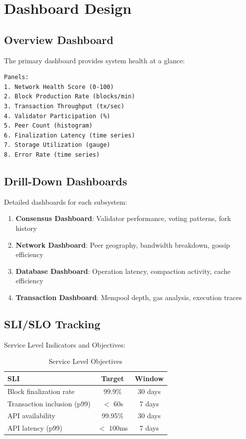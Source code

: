 \documentclass[11pt,a4paper]{article}
\begin{document}
\section{Dashboard Design}

\subsection{Overview Dashboard}

The primary dashboard provides system health at a glance:

\begin{lstlisting}
Panels:
1. Network Health Score (0-100)
2. Block Production Rate (blocks/min)
3. Transaction Throughput (tx/sec)
4. Validator Participation (%)
5. Peer Count (histogram)
6. Finalization Latency (time series)
7. Storage Utilization (gauge)
8. Error Rate (time series)
\end{lstlisting}

\subsection{Drill-Down Dashboards}

Detailed dashboards for each subsystem:

\begin{enumerate}
    \item \textbf{Consensus Dashboard}: Validator performance, voting patterns, fork history
    \item \textbf{Network Dashboard}: Peer geography, bandwidth breakdown, gossip efficiency
    \item \textbf{Database Dashboard}: Operation latency, compaction activity, cache efficiency
    \item \textbf{Transaction Dashboard}: Mempool depth, gas analysis, execution traces
\end{enumerate}

\subsection{SLI/SLO Tracking}

Service Level Indicators and Objectives:

\begin{table}[h]
\centering
\begin{tabular}{lcc}
\hline
\textbf{SLI} & \textbf{Target} & \textbf{Window} \\
\hline
Block finalization rate & 99.9\% & 30 days \\
Transaction inclusion (p99) & $<$ 60s & 7 days \\
API availability & 99.95\% & 30 days \\
API latency (p99) & $<$ 100ms & 7 days \\
\hline
\end{tabular}
\caption{Service Level Objectives}
\end{table}
\end{document}
